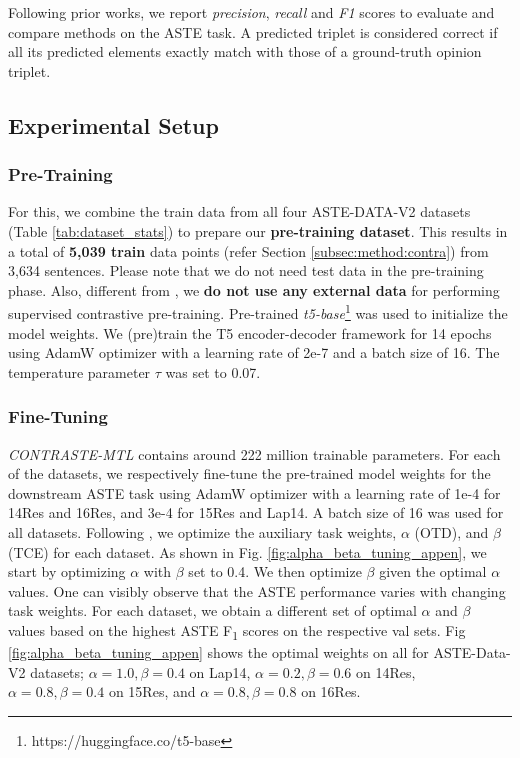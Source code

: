 Following prior works, we report \textit{precision}, \textit{recall} and \textit{F1} scores to evaluate and compare methods on the ASTE task. 
A predicted triplet is considered correct if all its predicted elements exactly match with those of a ground-truth opinion triplet.


\subsection{Experimental Setup}
\label{subsec:exp:setup}

\subsubsection{Pre-Training}
For this, we combine the train data from all four ASTE-DATA-V2 datasets (Table \ref{tab:dataset_stats}) to prepare our \textbf{pre-training dataset}.
This results in a total of \textbf{5,039 train} data points (refer Section \ref{subsec:method:contra}) from 3,634 sentences.
Please note that we do not need test data in the pre-training phase.
Also, different from \citet{li-etal-2021-learning-implicit}, we \textbf{do not use any external data} for performing supervised contrastive pre-training.
Pre-trained \textit{t5-base}\footnote{https://huggingface.co/t5-base} was used to initialize the model weights. 
We (pre)train the T5 encoder-decoder framework for 14 epochs using AdamW optimizer \cite{AdamW} with a learning rate of 2e-7 and a batch size of 16.
The temperature parameter $\tau$ was set to 0.07.


\subsubsection{Fine-Tuning}
\textit{CONTRASTE-MTL} contains around 222 million trainable parameters. 
For each of the datasets, we respectively fine-tune the pre-trained model weights for the downstream ASTE task using AdamW optimizer with a learning rate of 1e-4 for 14Res and 16Res, and 3e-4 for 15Res and Lap14. 
A batch size of 16 was used for all datasets. 
Following \citet{mrini-etal-2022-detection}, we optimize the auxiliary task weights, $\alpha$ (OTD), and $\beta$ (TCE) for each dataset.
As shown in Fig. \ref{fig:alpha_beta_tuning_appen}, we start by optimizing $\alpha$ with $\beta$ set to 0.4.
We then optimize $\beta$ given the optimal $\alpha$ values.
One can visibly observe that the ASTE performance varies with changing task weights.
For each dataset, we obtain a different set of optimal $\alpha$ and $\beta$ values based on the highest ASTE F\textsubscript{1} scores on the respective val sets.
Fig \ref{fig:alpha_beta_tuning_appen} shows the optimal weights on all for ASTE-Data-V2 datasets; $\alpha=1.0, \beta=0.4$ on Lap14, $\alpha=0.2, \beta=0.6$ on 14Res, $\alpha=0.8, \beta=0.4$ on 15Res,  and $\alpha=0.8, \beta=0.8$ on 16Res.


